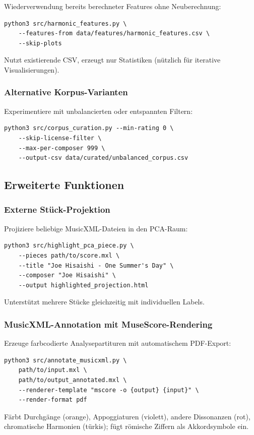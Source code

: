 \documentclass[12pt,a4paper]{article}
\theoremstyle{definition}
\begin{document}
Wiederverwendung bereits berechneter Features ohne Neuberechnung:
\begin{lstlisting}
python3 src/harmonic_features.py \
    --features-from data/features/harmonic_features.csv \
    --skip-plots
\end{lstlisting}
Nutzt existierende CSV, erzeugt nur Statistiken (nützlich für iterative Visualisierungen).

\subsubsection{Alternative Korpus-Varianten}

Experimentiere mit unbalancierten oder entspannten Filtern:
\begin{lstlisting}
python3 src/corpus_curation.py --min-rating 0 \
    --skip-license-filter \
    --max-per-composer 999 \
    --output-csv data/curated/unbalanced_corpus.csv
\end{lstlisting}

\subsection{Erweiterte Funktionen}

\subsubsection{Externe Stück-Projektion}

Projiziere beliebige MusicXML-Dateien in den PCA-Raum:
\begin{lstlisting}
python3 src/highlight_pca_piece.py \
    --pieces path/to/score.mxl \
    --title "Joe Hisaishi - One Summer's Day" \
    --composer "Joe Hisaishi" \
    --output highlighted_projection.html
\end{lstlisting}
Unterstützt mehrere Stücke gleichzeitig mit individuellen Labels.

\subsubsection{MusicXML-Annotation mit MuseScore-Rendering}

Erzeuge farbcodierte Analysepartituren mit automatischem PDF-Export:
\begin{lstlisting}
python3 src/annotate_musicxml.py \
    path/to/input.mxl \
    path/to/output_annotated.mxl \
    --renderer-template "mscore -o {output} {input}" \
    --render-format pdf
\end{lstlisting}
Färbt Durchgänge (orange), Appoggiaturen (violett), andere Dissonanzen (rot), chromatische Harmonien (türkis); fügt römische Ziffern als Akkordsymbole ein.
\end{document}
